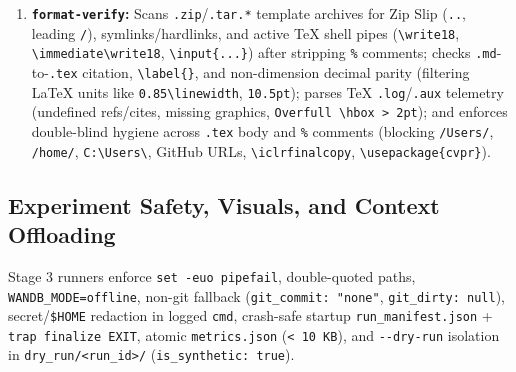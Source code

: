 \begin{enumerate}
  \begin{equation}
\begin{aligned}
&|m - v| \le \epsilon(d) \;\lor\; \\
&\quad \bigl(0 \le m \le 1 \;\land\; |100m - v| \le \epsilon(d)\bigr), \\
&\quad \epsilon(d) = 0.55 \times 10^{-d}
\end{aligned}
\label{eq:decimal-match}
\end{equation}

  where the second disjunct permits \(0\text{--}1 \to \%\) scaling strictly for \(m \in [0, 1]\) and \(\epsilon(d)\) allows standard rounding. Restricting regex matching to decimal tokens (\texttt{\textbackslash{}d+\textbackslash{}.\textbackslash{}d+}) avoids false alarms on section or epoch integers, intentionally delegating integer-count auditing, metric-key swapping within unordered \(\mathcal{M}(r)\), unit-ambiguous \([0, 1]\) scaling, and untagged paragraphs to \texttt{po-evidence-auditor}.
\item
  \textbf{\texttt{format-verify}:} Scans \texttt{.zip}/\allowbreak{}\texttt{.tar.\allowbreak{}*} template archives for Zip Slip (\texttt{..}, leading \texttt{/}), symlinks/hardlinks, and active TeX shell pipes (\texttt{\textbackslash{}write18}, \texttt{\textbackslash{}immediate\allowbreak{}\textbackslash{}write18}, \texttt{\textbackslash{}input\{\textbar{}...\}}) after stripping \texttt{\%} comments; checks \texttt{.md}-to-\texttt{.tex} citation, \texttt{\textbackslash{}label\{\}}, and non-dimension decimal parity (filtering LaTeX units like \texttt{0.85\textbackslash{}linewidth}, \texttt{10.5pt}); parses TeX \texttt{.log}/\allowbreak{}\texttt{.aux} telemetry (undefined refs/cites, missing graphics, \texttt{Overfull\ \textbackslash{}hbox\ \textgreater{}\ 2pt}); and enforces double-blind hygiene across \texttt{.tex} body and \texttt{\%} comments (blocking \texttt{/\allowbreak{}Users/}, \texttt{/\allowbreak{}home/}, \texttt{C:\textbackslash{}Users\textbackslash{}}, GitHub URLs, \texttt{\textbackslash{}iclrfinalcopy}, \texttt{\textbackslash{}usepackage\{cvpr\}}).
\end{enumerate}

\subsection{Experiment Safety, Visuals, and Context Offloading}\label{sec:method-safety}

Stage 3 runners enforce \texttt{set\ -euo\ pipefail}, double-quoted paths, \texttt{WANDB\_\allowbreak{}MODE=offline}, non-git fallback (\texttt{git\_\allowbreak{}commit:\ "none"}, \texttt{git\_\allowbreak{}dirty:\ null}), secret/\texttt{\$HOME} redaction in logged \texttt{cmd}, crash-safe startup \texttt{run\_\allowbreak{}manifest.\allowbreak{}json} + \texttt{trap\ finalize\ EXIT}, atomic \texttt{metrics.\allowbreak{}json} (\texttt{\textless{}\ 10\ KB}), and \texttt{\mbox{-{}-}dry-\allowbreak{}run} isolation in \texttt{dry\_\allowbreak{}run/\allowbreak{}\textless{}run\_\allowbreak{}id\textgreater{}/} (\texttt{is\_\allowbreak{}synthetic:\ true}).

